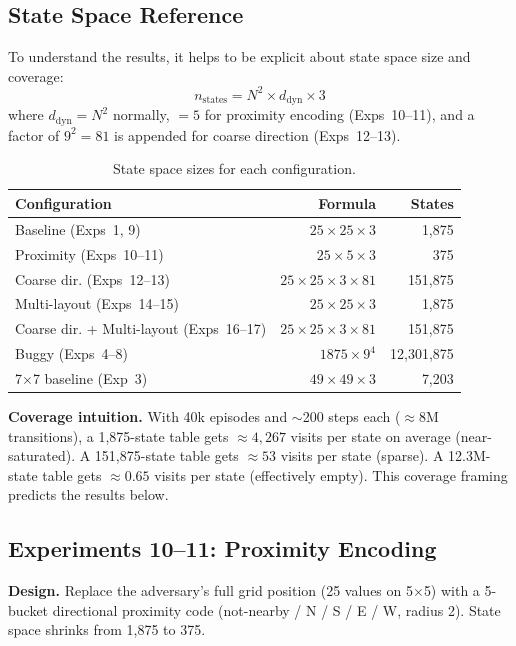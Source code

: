 \documentclass[sigconf]{aamas}
\begin{document}
\subsection{State Space Reference}

To understand the results, it helps to be explicit about state space size and
coverage:
\[
  n_\text{states} = N^2 \times d_\text{dyn} \times 3
\]
where $d_\text{dyn} = N^2$ normally, $= 5$ for proximity encoding (Exps~10--11),
and a factor of $9^2 = 81$ is appended for coarse direction (Exps~12--13).

\begin{table}[H]
\caption{State space sizes for each configuration.}
\label{tab:state-spaces}
\centering
\footnotesize
\begin{tabular}{lrr}
\toprule
\textbf{Configuration} & \textbf{Formula} & \textbf{States} \\
\midrule
Baseline (Exps~1, 9)    & $25 \times 25 \times 3$        & 1,875      \\
Proximity (Exps~10--11)     & $25 \times 5 \times 3$         & 375        \\
Coarse dir. (Exps~12--13)  & $25 \times 25 \times 3 \times 81$ & 151,875 \\
Multi-layout (Exps~14--15) & $25 \times 25 \times 3$        & 1,875      \\
Coarse dir. + Multi-layout  (Exps~16--17)     & $25 \times 25 \times 3 \times 81$ & 151,875 \\
Buggy (Exps~4--8)       & $1875 \times 9^4$              & 12,301,875 \\
7$\times$7 baseline (Exp~3)   & $49 \times 49 \times 3$        & 7,203      \\
\bottomrule
\end{tabular}
\end{table}

\textbf{Coverage intuition.} With 40k episodes and $\sim$200 steps each
($\approx 8$M transitions), a 1,875-state table gets $\approx 4{,}267$ visits per
state on average (near-saturated). A 151,875-state table gets $\approx 53$ visits
per state (sparse). A 12.3M-state table gets $\approx 0.65$ visits per state
(effectively empty). This coverage framing predicts the results below.



\subsection{Experiments 10--11: Proximity Encoding}
\textbf{Design.} Replace the adversary's full grid position (25 values on 5$\times$5)
with a 5-bucket directional proximity code (not-nearby / N / S / E / W, radius 2).
State space shrinks from 1,875 to 375. 
\end{document}
